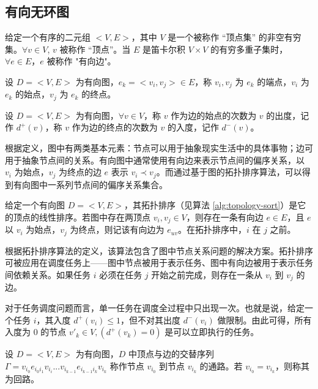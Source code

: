 \subsection{有向无环图}

\begin{dfn}
    给定一个有序的二元组 $<V, E>$，其中 $V$ 是一个被称作 “顶点集” 的非空有穷集。$\forall v \in V$, $v$ 被称作 “顶点”。当 $E$ 是笛卡尔积 $V \times V$ 的有穷多重子集时，$\forall e \in E$，$e$ 被称作 "有向边"。\cite{DISCRETEMATH}
\end{dfn}

\begin{dfn}
    设 $D = <V, E>$ 为有向图，$e_k = <v_i, v_j> \in E$，称 $v_i, v_j$ 为 $e_k$ 的端点，$v_i$ 为 $e_k$ 的始点，$v_j$ 为 $e_k$ 的终点。\cite{DISCRETEMATH}
\end{dfn}

\begin{dfn}
    设 $D = <V, E>$ 为有向图，$\forall v \in V$，称 $v$ 作为边的始点的次数为 $v$ 的出度，记作 $d^+(v)$，称 $v$ 作为边的终点的次数为 $v$ 的入度，记作 $d^-(v)$。
\end{dfn}

根据定义，图中有两类基本元素：节点可以用于抽象现实生活中的具体事物；边可用于抽象节点间的关系。有向图中通常使用有向边来表示节点间的偏序关系，以 $v_i$ 为始点，$v_j$ 为终点的边 $e$ 表示 $v_i \prec v_j$。而通过基于图的拓扑排序算法，可以得到有向图中一系列节点间的偏序关系集合。

\begin{dfn}
    给定一个有向图 $D = <V, E>$，其拓扑排序（见算法 \ref{alg:topology-sort}）是它的顶点的线性排序。若图中存在两顶点 $v_i, v_j \in V$，则存在一条有向边 $e \in E$，且 $e$ 以 $v_i$ 为始点，$v_j$ 为终点，则记该有向边为 $e_{u v}$。在拓扑排序中，$i$ 在 $j$ 之前。
\end{dfn}

根据拓扑排序算法的定义，该算法包含了图中节点关系问题的解决方案。拓扑排序可被应用在调度任务上——图中节点被用于表示任务、图中有向边被用于表示任务间依赖关系。如果任务 $i$ 必须在任务 $j$ 开始之前完成，则存在一条从 $v_i$ 到 $v_j$ 的边。

对于任务调度问题而言，单一任务在调度全过程中只出现一次。也就是说，给定一个任务 $i$，其入度 $d^+(v_i) \le 1$，但不对其出度 $d^-(v_i)$ 做限制。由此可得，所有入度为 0 的节点 ${v'}_k \in V, (d^+(v_k) = 0)$ 是可以立即执行的任务。

\begin{dfn}
    设 $D = <V, E>$ 为有向图，$D$ 中顶点与边的交替序列 $\varGamma = v_{i_0} e_{i_0 i_1} v_{i_i} ... v_{i_{k-1}} e_{i_{k-1} i_k} v_{i_k}$ 称作节点 $v_{i_0}$ 到节点 $v_{i_k}$ 的通路。若 $v_{i_0} = v_{i_k}$，则称其为回路。
\end{dfn}

